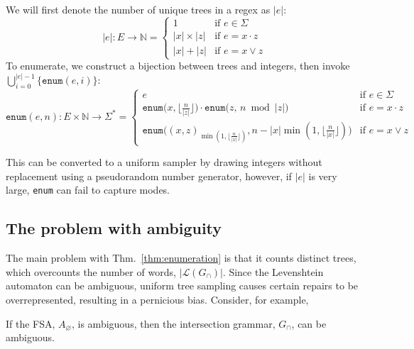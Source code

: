 \documentclass[popl.tex]{subfiles}
\begin{document}
\begin{theorem}[Enumeration]\label{thm:enumeration}
  We will first denote the number of unique trees in a regex as $|e|$:
  \begin{equation}
    |e|: E \rightarrow \mathbb{N} = \begin{cases}
        1           & \text{if } e \in \Sigma \\
        |x| \times |z|  & \text{if } e = x \cdot z \\
        |x| + |z|       & \text{if } e = x \vee z
    \end{cases}
  \end{equation}
  To enumerate, we construct a bijection between trees and integers, then invoke $\bigcup_{i = 0}^{|e|-1}\big\{\texttt{enum}(e, i)\big\}$:
  \begin{equation}
    \texttt{enum}(e, n): E \times \mathbb{N} \rightarrow \Sigma^* = \begin{cases}
         e &\text{if } e \in \Sigma \\
         \texttt{enum}\big(x, \lfloor \frac{n}{|z|} \rfloor\big) \cdot \texttt{enum}\big(z,\, n \bmod |z|\big)  &\text{if } e = x \cdot z \\
         \texttt{enum}\big((x, z)_{\min(1, \lfloor\frac{n}{|x|}\rfloor)}, n-|x|\min(1, \lfloor\frac{n}{|x|}\rfloor)\big) &\text{if } e = x \vee z
    \end{cases}
  \end{equation}
\end{theorem}

This can be converted to a uniform sampler by drawing integers without replacement using a pseudorandom number generator, however, if $|e|$ is very large, \texttt{enum} can fail to capture modes.

\subsection{The problem with ambiguity}

The main problem with Thm.~\ref{thm:enumeration} is that it counts distinct trees, which overcounts the number of words, $|\mathcal{L}(G_\cap)|$. Since the Levenshtein automaton can be ambiguous, uniform tree sampling causes certain repairs to be overrepresented, resulting in a pernicious bias. Consider, for example,

\begin{lemma}\label{lemma:ambiguity}
If the FSA, $A_\varnothing$, is ambiguous, then the intersection grammar, $G_\cap$, can be ambiguous.
\end{lemma}
\end{document}
